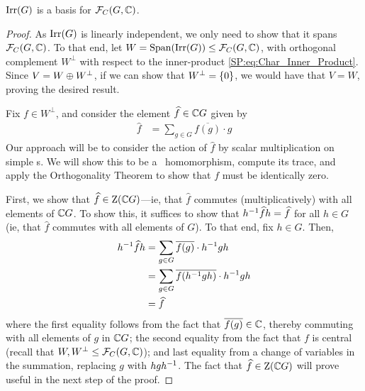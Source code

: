 \begin{boxtheorem} \label{SP:Thm:Irred_Char_Basis}
    $\operatorname{Irr}\!\left( G \right)$ is a basis for $\mathcal{F}_C\!\left( G, \mathbb{C} \right)$.
\end{boxtheorem}
\begin{proof}
    As $\operatorname{Irr}\!\left( G \right)$ is linearly independent, we only need to show that it spans $\mathcal{F}_C\!\left( G, \mathbb{C} \right)$. To that end, let $W = \operatorname{Span}\!\left( \operatorname{Irr}\!\left( G \right) \right) \leq \mathcal{F}_C\!\left( G, \mathbb{C} \right)$, with orthogonal complement $W^\perp$ with respect to the inner-product \eqref{SP:eq:Char_Inner_Product}. Since $V = W \oplus W^\perp$, if we can show that $W^\perp = \left\{ 0 \right\}$, we would have that $V = W$, proving the desired result.

    Fix $f \in W^\perp$, and consider the element $\widehat{f} \in \mathbb{C} G$ given by  %
    \begin{align*}
        \hat{f} &= \sum_{g \in G} \overline{f(g)} \cdot g
    \end{align*}
    Our approach will be to consider the action of $\hat{f}$ by scalar multiplication on simple \CGM s. We will show this to be a \CGM\ homomorphism, compute its trace, and apply the Orthogonality Theorem to show that $f$ must be identically zero.

    First, we show that $\widehat{f} \in \operatorname{Z}\!\left( \mathbb{C} G \right)$---ie, that $\hat{f}$ commutes (multiplicatively) with all elements of $\mathbb{C} G$. To show this, it suffices to show that $h^{-1} \widehat{f} h = \widehat{f}$ for all $h \in G$ (ie, that $\hat{f}$ commutes with all elements of $G$). To that end, fix $h \in G$. Then,
    \begin{align*}
        h\inv \hat{f} h &=
        \sum_{g \in G} \overline{f(g)} \cdot h\inv g h \\
        &= \sum_{g \in G} \overline{\fof{h\inv g h}} \cdot h\inv g h \\ %
        &= \hat{f}
    \end{align*}
    where the first equality follows from the fact that $\overline{f(g)} \in \mathbb{C}$, thereby commuting with all elements of $g$ in $\mathbb{C} G$; the second equality from the fact that $f$ is central (recall that $W, W^{\perp} \leq \mathcal{F}_C\!\left( G, \mathbb{C} \right)$); and last equality from a change of variables in the summation, replacing $g$ with $hgh^{-1}$. The fact that $\widehat{f} \in \operatorname{Z}\!\left( \mathbb{C} G \right)$ will prove useful in the next step of the proof.


\end{proof}

